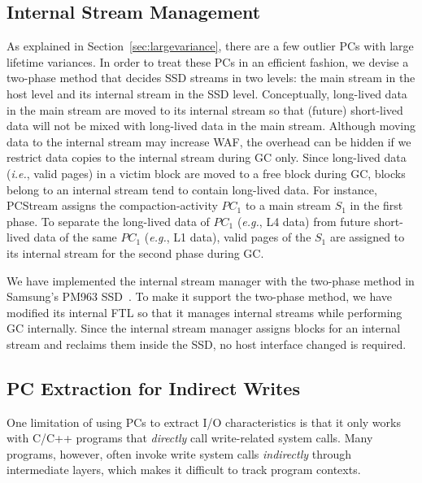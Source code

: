 \subsection{Internal Stream Management}
As explained in Section~\ref{sec:largevariance}, there are a few outlier PCs with large lifetime
variances. In order to treat these PCs in an efficient fashion, we devise a
two-phase method that decides SSD streams in two levels: the main stream in the
host level and its internal stream in the SSD level.  Conceptually, long-lived
data in the main stream are moved to its internal stream so that (future)
short-lived data will not be mixed with long-lived data in the main stream.
Although moving data to the internal stream may increase WAF, the overhead can
be hidden if we restrict data copies to the internal stream during GC only.
Since long-lived data ({\it i.e.}, valid pages) in a victim block are moved to a free
block during GC, blocks belong to an internal stream tend to contain long-lived
data.  For instance, \textsf{\small PCStream} assigns the compaction-activity
{\it $PC_1$} to a main stream {\it $S_1$} in the first phase.  To separate the
long-lived data of {\it $PC_1$} ({\it e.g.}, L4 data) from future short-lived data of
the same {\it $PC_1$} ({\it e.g.}, L1 data), valid pages of the {\it $S_1$} are
assigned to its internal stream for the second phase during GC.

We have implemented the internal stream manager with the two-phase method in
Samsung's PM963 SSD~\cite{PM963}. To make it support the two-phase method, we
have modified its internal FTL so that it manages internal streams while
performing GC internally.  Since the internal stream manager assigns blocks for
an internal stream and reclaims them inside the SSD, no host interface changed
is required.


\subsection{PC Extraction for Indirect Writes}
One limitation of using PCs to extract I/O characteristics is that it only
works with C/C++ programs that \textit{directly} call write-related system
calls.  Many programs, however, often invoke write system calls
\textit{indirectly} through intermediate layers, which makes it difficult to
track program contexts.

